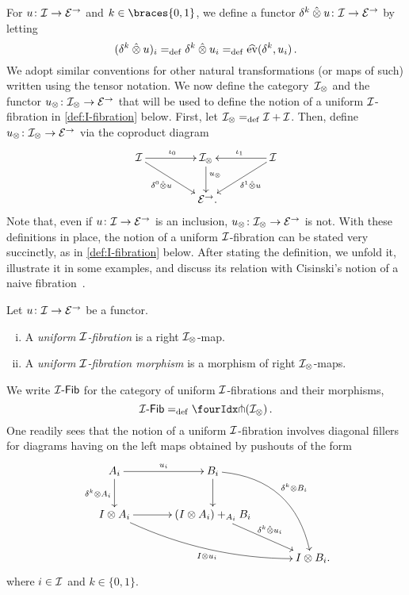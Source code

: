 \documentclass[reqno,10pt,a4paper,oneside,draft]{amsart}
\begin{document}
For $u \co \cal{I} \to \catE^\to$ and $k \in \braces{0, 1}$, we define a functor $\kcyl \hatotimes u \co \cal{I} \to \catE^\to$ by letting
\[
  (\kcyl \hatotimes u)_i \defeq \kcyl \hatotimes u_i  \defeq \hateval(\kcyl, u_i) \, .
\]
We adopt similar conventions for other natural transformations (or maps of such) written using the tensor notation.
We now define the category~$\cal{I}_\otimes$ and the functor $u_\otimes \co \cal{I}_\otimes \to \catE^\to$ that will be used to define the notion of a uniform $\cal{I}$-fibration in \cref{def:I-fibration} below.
First, let $\cal{I}_\otimes \defeq \cal{I} + \cal{I}$.
Then, define $u_\otimes \co \cal{I}_\otimes \to \catE^\to$ via the coproduct diagram
\begin{equation}
\label{equ:u-tensor}
\begin{gathered}
\xymatrix@C+2em{
  \cal{I}
  \ar[r]^{\iota_0}
  \ar[dr]_-{\lcyl \hatotimes u}
&
  \cal{I}_\otimes
  \ar[d]^(.4){u_\otimes}
&
  \cal{I}
  \ar[dl]^-{\rcyl \hatotimes u}
  \ar[l]_{\iota_1}
\\&
  \catE^\to
\rlap{.}}
\end{gathered}
\end{equation}
Note that, even if $u \co \cal{I} \to \catE^\to$ is an inclusion, $u_\otimes \co \cal{I}_\otimes \to \catE^\to$ is not.
With these definitions in place, the notion of a uniform $\cal{I}$-fibration can be stated very succinctly, as in \cref{def:I-fibration} below.
After stating the definition, we unfold it, illustrate it in some examples, and discuss its relation with Cisinski's notion of a naive fibration~\cite{cisinski-asterisque}.

\begin{definition} \label{def:I-fibration}
Let $u \co \cal{I} \to \catE^\to$ be a functor.
\begin{enumerate}[(i)]
\item A \emph{uniform $\cal{I}$-fibration} is a right $\cal{I}_\otimes$-map.
\item A \emph{uniform $\cal{I}$-fibration morphism} is a morphism of right $\cal{I}_\otimes$-maps.
\end{enumerate}
\end{definition}

We write $\Fib{\cal{I}}$ for the category of uniform $\cal{I}$-fibrations and their morphisms, \ie
\[
  \Fib{\cal{I}} \defeq \liftr{(\cal{I}_\otimes)} \, .
\]
One readily sees that the notion of a uniform $\cal{I}$-fibration involves diagonal fillers for diagrams having on the left maps obtained by pushouts of the form
\begin{gather*}
\xymatrix@C=1.2cm{
  A_i
  \ar[r]^{u_i}
  \ar[d]_{\kcyl \otimes A_i}
&
  B_i
  \ar@/^2pc/[ddr]^{\kcyl \otimes B_i}
  \ar[d]
&\\
  \interval \otimes A_i
  \ar@/_1pc/[drr]_{\interval \otimes u_i}
  \ar[r]
&
  (\interval \otimes A_i) +_{A_i} B_i
  \ar[dr]^-{\delta^k \hatotimes u_i}
&\\&&
  \interval \otimes B_i
\rlap{.}}
\end{gather*}
where $i \in \cal{I}$ and $k \in \{0, 1 \}$.
\end{document}
